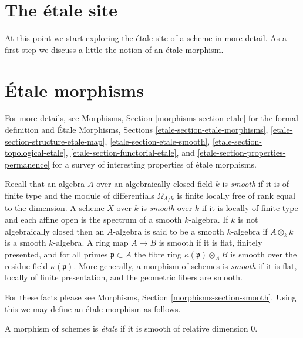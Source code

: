 \section{The \'etale site}
\label{section-etale-site}

\noindent
At this point we start exploring the \'etale site of a scheme in
more detail. As a first step we discuss a little the notion of an
\'etale morphism.





\section{\'Etale morphisms}
\label{section-etale-morphism}

\noindent
For more details, see
Morphisms, Section \ref{morphisms-section-etale}
for the formal definition and
\'Etale Morphisms, Sections
\ref{etale-section-etale-morphisms},
\ref{etale-section-structure-etale-map},
\ref{etale-section-etale-smooth},
\ref{etale-section-topological-etale},
\ref{etale-section-functorial-etale}, and
\ref{etale-section-properties-permanence}
for a survey of interesting properties of \'etale morphisms.

\medskip\noindent
Recall that an algebra $A$ over an algebraically closed field $k$ is
{\it smooth} if it is of finite type and the module of differentials
$\Omega_{A/k}$ is finite locally free of rank equal to the dimension.
A scheme $X$ over $k$ is {\it smooth} over $k$ if it is locally of finite
type and each affine open is the spectrum of a smooth $k$-algebra.
If $k$ is not algebraically closed then an $A$-algebra is said to be
a smooth $k$-algebra if $A \otimes_k \overline{k}$ is a smooth
$\overline{k}$-algebra. A ring map $A \to B$ is smooth if it is
flat, finitely presented, and for all primes $\mathfrak p \subset A$
the fibre ring $\kappa(\mathfrak p) \otimes_A B$ is smooth over the residue
field $\kappa(\mathfrak p)$. More generally, a morphism of schemes is
{\it smooth} if it is flat, locally of finite presentation, and the
geometric fibers are smooth.

\medskip\noindent
For these facts please see
Morphisms, Section \ref{morphisms-section-smooth}.
Using this we may define an \'etale morphism as follows.

\begin{definition}
\label{definition-etale-morphism}
A morphism of schemes is {\it \'etale} if it is smooth of relative dimension 0.
\end{definition}

